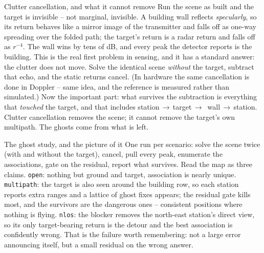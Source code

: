 \documentclass[10pt]{beamer}
\begin{document}
\begin{frame}{Clutter cancellation, and what it cannot remove}
  Run the scene as built and the target is invisible --
  not marginal, invisible. A building wall reflects
  \emph{specularly}, so its return behaves like a mirror
  image of the transmitter and falls off as one-way
  spreading over the folded path; the target's return is a
  radar return and falls off as $r^{-4}$. The wall wins by
  tens of dB, and every peak the detector reports is the
  building. This is the real first problem in sensing, and
  it has a standard answer: the clutter does not move.
  Solve the identical scene \emph{without} the target,
  subtract that echo, and the static returns cancel. (In
  hardware the same cancellation is done in Doppler --
  same idea, and the reference is measured rather than
  simulated.) Now the important part: what survives the
  subtraction is everything that \emph{touched} the
  target, and that includes station\,$\to$\,target\,$\to$
  \,wall\,$\to$\,station. Clutter cancellation removes the
  scene; it cannot remove the target's own multipath. The
  ghosts come from what is left.
\end{frame}

\begin{frame}{The ghost study, and the picture of it}
  One run per scenario: solve the scene twice (with and
  without the target), cancel, pull every peak, enumerate
  the associations, gate on the residual, report what
  survives. Read the map as three claims. \texttt{open}:
  nothing but ground and target, association is nearly
  unique. \texttt{multipath}: the target is also seen
  around the building row, so each station reports extra
  ranges and a lattice of ghost fixes appears; the
  residual gate kills most, and the survivors are the
  dangerous ones -- consistent positions where nothing is
  flying. \texttt{nlos}: the blocker removes the north-east
  station's direct view, so its only target-bearing return
  is the detour and the best association is confidently
  wrong. That is the failure worth remembering: not a
  large error announcing itself, but a small residual on
  the wrong answer.
\end{frame}
\end{document}
